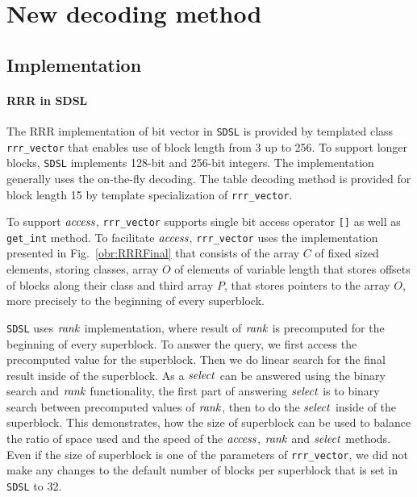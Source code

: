 \section{New decoding method}

\subsection{Implementation}

\paragraph{RRR in SDSL}

The RRR implementation of bit vector in \texttt{SDSL} is provided by templated class \verb'rrr_vector'
that enables use of block length from 3 up to 256. To support longer blocks,
\texttt{SDSL} implements 128-bit and 256-bit integers. The implementation generally uses the
on-the-fly decoding. The table decoding method is provided for block length 15 by template specialization
of \verb'rrr_vector'.

To support $\mathit{access}$, \verb'rrr_vector' supports single bit access operator \verb'[]' as well
as \verb'get_int' method. To facilitate $\mathit{access}$, \verb'rrr_vector' uses the implementation
presented in Fig.~\ref{obr:RRRFinal} that consists of the array $C$ of fixed sized elements, storing
classes, array $O$ of elements of variable length that stores offsets of blocks along their class and
third array $P$, that stores pointers to the array $O$, more precisely to the beginning of every superblock.

\texttt{SDSL} uses $\mathit{rank}$ implementation, where result of $\mathit{rank}$ is precomputed for the beginning
of every superblock. To answer the query, we first access the precomputed value for the superblock. Then
we do linear search for the final result inside of the superblock. As a $\mathit{select}$ can be answered
using the binary search and $\mathit{rank}$ functionality, the first part of answering $\mathit{select}$ is to binary
search between precomputed values of $\mathit{rank}$, then to do the $\mathit{select}$ inside of the superblock. This
demonstrates, how the size of superblock can be used to balance the ratio of space used and the speed
of the $\mathit{access}$, $\mathit{rank}$ and $\mathit{select}$ methods. Even if the size of superblock is one of the parameters
of \verb'rrr_vector', we did not make any changes to the default number of blocks per superblock that
is set in \texttt{SDSL} to 32.

